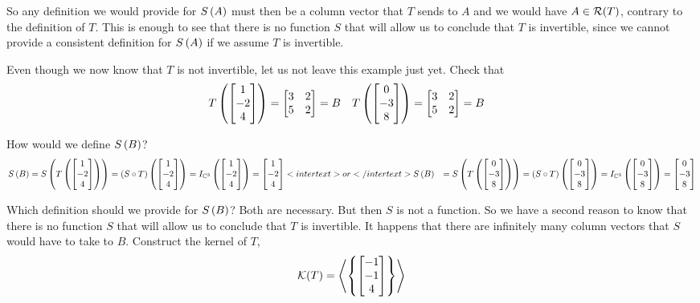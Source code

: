 \documentclass{ximera}
\begin{document}
\begin{example}
So any definition we would provide for $S\left(A\right)$ must then be a column vector that $T$ sends to $A$ and we would have $A\in\mathcal{R}\!\left(T\right)$, contrary to the definition of $T$.  This is enough to see that there is no function $S$ that will allow us to conclude that $T$ is invertible, since we cannot provide a consistent definition for $S\left(A\right)$ if we assume $T$ is invertible.



Even though we now know that $T$ is not invertible, let us not leave this example just yet.  Check that
\begin{align*}
T\left(\begin{bmatrix}1\\-2\\4\end{bmatrix}\right)&=\begin{bmatrix}3&2\\5&2\end{bmatrix}=B&
T\left(\begin{bmatrix}0\\-3\\8\end{bmatrix}\right)&=\begin{bmatrix}3&2\\5&2\end{bmatrix}=B
\end{align*}




How would we define $S\left(B\right)$?
\begin{align*}
S\left(B\right)&=S\left(T\left(\begin{bmatrix}1\\-2\\4\end{bmatrix}\right)\right)
=\left({S}\circ{T}\right)\left(\begin{bmatrix}1\\-2\\4\end{bmatrix}\right)
=I_{\mathbb{C}^{3}}\left(\begin{bmatrix}1\\-2\\4\end{bmatrix}\right)=\begin{bmatrix}1\\-2\\4\end{bmatrix}
<intertext>or</intertext>
S\left(B\right)&=S\left(T\left(\begin{bmatrix}0\\-3\\8\end{bmatrix}\right)\right)
=\left({S}\circ{T}\right)\left(\begin{bmatrix}0\\-3\\8\end{bmatrix}\right)
=I_{\mathbb{C}^{3}}\left(\begin{bmatrix}0\\-3\\8\end{bmatrix}\right)=\begin{bmatrix}0\\-3\\8\end{bmatrix}
\end{align*}




Which definition should we provide for $S\left(B\right)$?  Both are necessary.  But then $S$ is not a function.  So we have a second reason to know that there is no function $S$ that will allow us to conclude that $T$ is invertible.  It happens that there are infinitely many column vectors that $S$ would have to take to $B$.  Construct the kernel of $T$,
\[
\mathcal{K}\!\left(T\right)=\left\langle\left\{\begin{bmatrix}-1\\-1\\4\end{bmatrix}\right\}\right\rangle
\]





\end{example}
\end{document}
